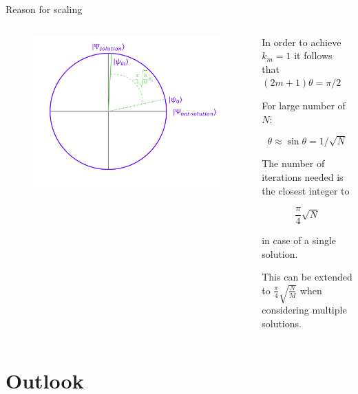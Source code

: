 \documentclass[11p,aspectratio=169]{beamer}
\begin{document}
\begin{frame}{Reason for scaling}
    \begin{columns}
        \begin{column}{0.5 \textwidth}
            \begin{figure}
                \includegraphics[width= \textwidth]{figures/grover2.png}
            \end{figure}
        \end{column}

        \begin{column}{0.5 \textwidth}
            In order to achieve $k_m = 1$ it follows that $(2 m + 1) \theta = \pi / 2$

    For large number of $N$:

    \begin{equation*}
        \theta \approx \sin \theta = 1 / \sqrt{N}
    \end{equation*}

    The number of iterations needed is the closest integer to

    $$ \frac{\pi}{4} \sqrt{N}$$

    in case of a single solution.

    This can be extended to $ \frac{\pi}{4} \sqrt{\frac{N}{M}}$ when considering
    multiple solutions.
        \end{column}
    \end{columns}
\end{frame}


\section{Outlook}
\end{document}

